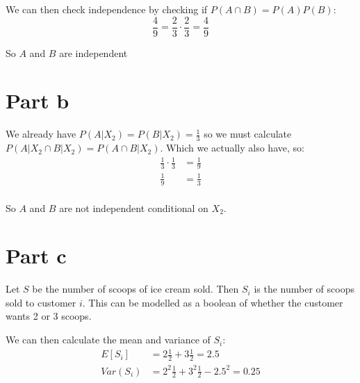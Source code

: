 We can then check independence by checking if $P(A \cap B) = P(A)P(B)$:
\[
	\frac{4}{9} = \frac{2}{3} \cdot \frac{2}{3} = \frac{4}{9}
\]

So $A$ and $B$ are independent

\section{Part b}

We already have $P(A|X_2) = P(B|X_2) = \frac{1}{3}$ so we must calculate $P(A|X_2 \cap B|X_2) = P(A\cap B|X_2)$. Which we actually also have, so:
\begin{align*}
	\frac{1}{3} \cdot \frac{1}{3} & = \frac{1}{9} \\
	\frac{1}{9}                   & = \frac{1}{3} \\
\end{align*}

So $A$ and $B$ are not independent conditional on $X_2$.

\section{Part c}

Let $S$ be the number of scoops of ice cream sold. Then $S_i$ is the number of scoops sold to customer $i$. This can be modelled as a boolean of whether the customer wants 2 or 3 scoops.

We can then calculate the mean and variance of $S_i$:
\begin{align*}
	E[S_i]   & = 2\frac{1}{2} + 3\frac{1}{2} = 2.5              \\
	Var(S_i) & = 2^2\frac{1}{2} + 3^2\frac{1}{2} - 2.5^2 = 0.25
\end{align*}

